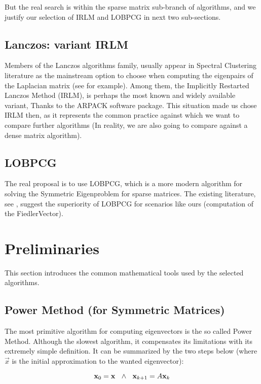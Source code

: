 But the real search is within the sparse matrix sub-branch of
algorithms, and we justify our selection of \gls{IRLM} and
\gls{LOBPCG} in next two sub-sections.

\subsection{Lanczos: variant \gls{IRLM}}

Members of the Lanczos algorithms family, 
usually appear in Spectral Clustering literature as the mainstream
option to choose when computing the eigenpairs of the
\gls{Laplacian} matrix (see \cite{luxburg07} for example). Among them,
the Implicitly Restarted Lanczos Method (\gls{IRLM}), is perhaps
the most known and widely available variant, Thanks to the
ARPACK \cite{arpack} software package. This situation made us chose
\gls{IRLM} then, as it represents the common practice
against which we want to compare further algorithms (In reality, we are
also going to compare against a dense matrix algorithm).

\subsection{\gls{LOBPCG}}

The real proposal is to use \gls{LOBPCG}, which is a more modern
algorithm for solving the Symmetric Eigenproblem for sparse
matrices. The existing literature, see \cite{knyazev03}, suggest the
superiority of LOBPCG for scenarios like ours (computation of the
\gls{FiedlerVector}). 

\section{Preliminaries}

This section introduces the common mathematical tools used by the
selected algorithms.

\subsection{Power Method (for Symmetric Matrices)}

The most primitive algorithm for computing eigenvectors is the so
called Power Method. Although the slowest algorithm, it compensates
its limitations with its extremely simple definition. It can be
summarized by the two steps below (where $\vec{x}$ is the initial
approximation to the wanted eigenvector):

\begin{equation}
  \label{eq:power-method-iter}
    \mathbf{x}_0 = \mathbf{x} \,\,\,\,\land\,\,\,\,
    \mathbf{x}_{k+1} = A\mathbf{x}_k  
\end{equation}
\joinbelow{1cm}

